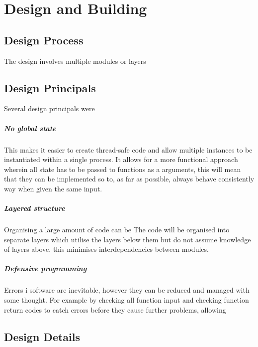 \documentclass{article}
\begin{document}
\section{Design and Building}

\subsection{Design Process}

The design involves multiple modules or layers

\subsection{Design Principals}
Several design principals were

\subparagraph{No global state}
This makes it easier to create thread-safe code and allow multiple instances to be instantiated within a single process. It allows for a more functional approach wherein all state has to be passed to functions as a arguments, this will mean that they can be implemented so to, as far as possible, always behave consistently way when given the same input.

\subparagraph{Layered structure}
Organising a large amount of code can be
The code will be organised into separate layers which utilise the layers below them but do not assume knowledge of layers above. this minimises interdependencies between modules.

\subparagraph{Defensive programming}
Errors i software are inevitable, however they can be reduced and managed with some thought. For example by checking all function input and checking function return codes to catch errors before they cause further problems, allowing

\subsection{Design Details}
\end{document}
